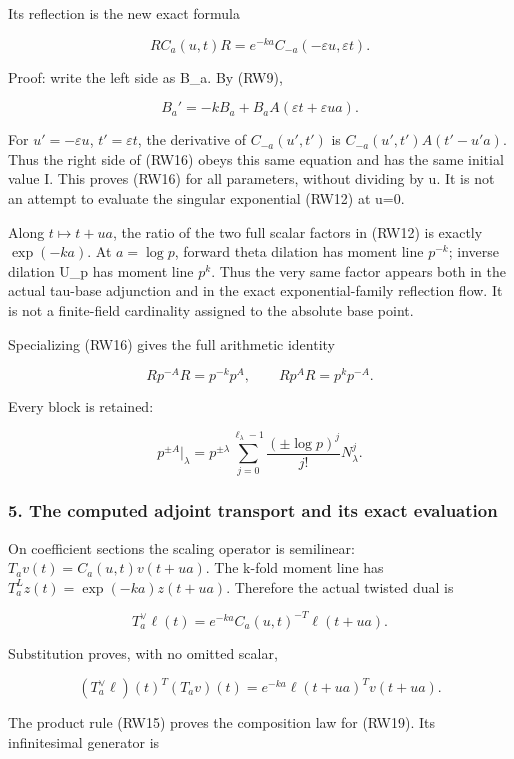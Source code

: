 \documentclass{article}
\begin{document}
Its reflection is the new exact formula

\[
\boxed{R C_a(u,t)R=e^{-ka}C_{-a}(-\varepsilon u,\varepsilon t).}
\tag{RW16}
\]

Proof: write the left side as B\_a. By (RW9),

\[
B_a'=-kB_a+B_aA(\varepsilon t+\varepsilon ua).
\]

For \(u'=-\varepsilon u\), \(t'=\varepsilon t\), the derivative of \(C_{-a}(u',t')\) is \(C_{-a}(u',t')A(t'-u' a)\). Thus the right side of (RW16) obeys this same equation and has the same initial value I. This proves (RW16) for all parameters, without dividing by u. It is not an attempt to evaluate the singular exponential (RW12) at u=0.

Along \(t\mapsto t+ua\), the ratio of the two full scalar factors in (RW12) is exactly \(\exp(-ka)\). At \(a=\log p\), forward theta dilation has moment line \(p^{-k}\); inverse dilation U\_p has moment line \(p^k\). Thus the very same factor appears both in the actual tau-base adjunction and in the exact exponential-family reflection flow. It is not a finite-field cardinality assigned to the absolute base point.

Specializing (RW16) gives the full arithmetic identity

\[
R p^{-A} R=p^{-k}p^A,
\qquad R p^A R=p^k p^{-A}.
\tag{RW17}
\]

Every block is retained:

\[
p^{\pm A}|_{\lambda}
=p^{\pm\lambda}\sum_{j=0}^{\ell_\lambda-1}
\frac{(\pm\log p)^j}{j!}N_\lambda^j.
\tag{RW18}
\]

\subsubsection{5. The computed adjoint transport and its exact evaluation}\label{endpoint-f1_reflection--the-computed-adjoint-transport-and-its-exact-evaluation}

On coefficient sections the scaling operator is semilinear: \(T_av(t)=C_a(u,t)v(t+ua)\). The k-fold moment line has \(T_a^Lz(t)=\exp(-ka)z(t+ua)\). Therefore the actual twisted dual is

\[
\boxed{T_a^\vee\ell(t)
=e^{-ka}C_a(u,t)^{-T}\ell(t+ua).}
\tag{RW19}
\]

Substitution proves, with no omitted scalar,

\[
(T_a^\vee\ell)(t)^T(T_av)(t)
=e^{-ka}\ell(t+ua)^Tv(t+ua).
\tag{RW20}
\]

The product rule (RW15) proves the composition law for (RW19). Its infinitesimal generator is
\end{document}
